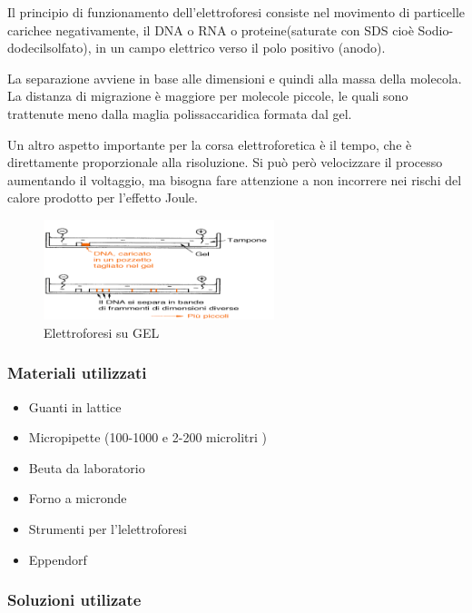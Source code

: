 Il principio di funzionamento dell'elettroforesi consiste nel movimento di particelle carichee negativamente, il DNA o RNA o proteine(saturate con SDS cioè Sodio-dodecilsolfato), in un campo elettrico verso il polo positivo (anodo).

La separazione avviene in base alle dimensioni e quindi alla massa della molecola. La distanza di migrazione è maggiore per molecole piccole, le quali sono trattenute meno dalla maglia polissaccaridica formata dal gel.

Un altro aspetto importante per la corsa elettroforetica è il tempo, che è direttamente proporzionale alla risoluzione. Si può però velocizzare il processo aumentando il voltaggio, ma bisogna fare attenzione a non incorrere nei rischi del calore prodotto per l'effetto Joule.

\begin{figure}[H]

	\centering
	\includegraphics[width=0.6\textwidth]{./immagini/elettroforesi.png}
	\caption{Elettroforesi su GEL}
	\label{elettroforesi}

\end{figure}

\subsubsection{Materiali utilizzati}

\begin{itemize}
	\item Guanti in lattice
	\item Micropipette (100-1000  e 2-200 microlitri  )
	\item Beuta da laboratorio
	\item Forno a micronde
	\item Strumenti per l'lelettroforesi
	\item Eppendorf
\end{itemize}


\subsubsection{Soluzioni utilizate}

